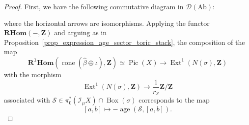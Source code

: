 \documentclass{proc-l}
\newcommand{\Z}{\mathbf{Z}}
\DeclareMathOperator{\Pic}{Pic}
\DeclareMathOperator{\Ext}{Ext}
\DeclareMathOperator{\coneform}{cone}
\DeclareMathOperator{\age}{age}
\DeclareMathOperator{\Boxe}{Box}
\newcommand{\stackS}{\mathcal{S}}
\newcommand{\sheafI}{\mathcal{I}}
\newcommand{\twistsector}{\pi_0^*(\sheafI_{\mu} X)}
\theoremstyle{definition}
\theoremstyle{remark}
\numberwithin{equation}{section}
\begin{document}
\begin{proof}
First, we have the following commutative diagram in $\mathcal{D}(\mathrm{Ab})$:
\begin{center}
\end{center}
where the horizontal arrows are isomorphisms. Applying the functor $\mathbf{RHom}(-,\Z)$ and arguing as in Proposition~\ref{prop_expression_age_sector_toric_stack}, the composition of the map
\[
\mathbf{R^1 Hom}(\coneform(\widehat{\beta}\oplus \iota),\Z) \simeq \Pic(X) \longrightarrow \Ext^1(N(\sigma),\Z)
\]
with the morphism
\[
\Ext^1(N(\sigma),\Z) \longrightarrow \frac{1}{r_{\stackS}} \Z / \Z
\]
associated with $\stackS \in \twistsector \cap \Boxe(\sigma)$ corresponds to the map
\[
[a,b] \longmapsto - \age(\stackS,[a,b]).
\]


\end{proof}
\end{document}
